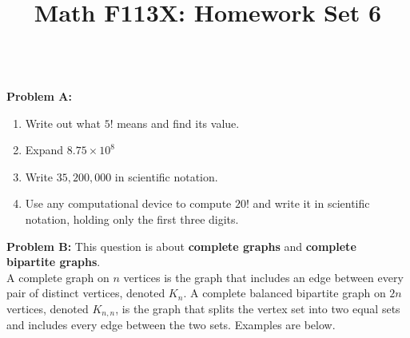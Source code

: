 \documentclass[11pt, oneside]{article}   	%
\title{Math F113X: Homework Set 6}
\date{}							%
\begin{document}
\maketitle




\quad\\

\textbf{Problem A:} 
\begin{enumerate}
\item Write out what $5!$ means and find its value.
\item Expand $8.75 \times 10^8$
\item Write $35,200,000$ in scientific notation.
\item Use any computational device to compute $20!$ and write it in scientific notation, holding only the first three digits.\\
\end{enumerate}

\hrulefill
\vfill

\textbf{Problem B:} This question is about \textbf{complete graphs} and \textbf{complete bipartite graphs}.\\
A complete graph on $n$ vertices is the graph that includes an edge between every pair of distinct vertices, denoted $K_n.$ A complete balanced bipartite graph on $2n$ vertices, denoted $K_{n,n}$, is the graph that splits the vertex set into two equal sets and includes every edge between the two sets. Examples are below.
\end{document}
